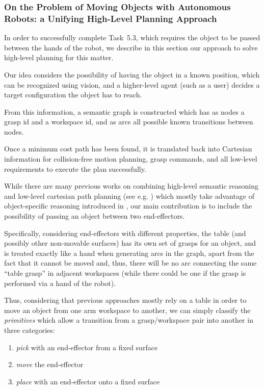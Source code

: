 
\subsubsection{On the Problem of Moving Objects with Autonomous Robots: a Unifying High-Level Planning Approach}
\label{sec:HighLevelPlanning}

In order to successfully complete Task~5.3, which requires the object to be passed between the hands of the robot, we describe in this section our approach to solve high-level planning for this matter.

Our idea considers the possibility of having the object in a known position, which can be recognized using vision, and a higher-level agent (such as a user) decides a target configuration the object has to reach.

From this information, a semantic graph is constructed which has as nodes a grasp id and a workspace id, and as arcs all possible known transitions between nodes.

Once a minimum cost path has been found, it is translated back into Cartesian information for collision-free motion planning, grasp commands, and all low-level requirements to execute the plan successfully.

While there are many previous works on combining high-level semantic reasoning and low-level cartesian path planning (see e.g. \cite{karlsson2012combining, leidner2012things, leidner2013hybrid}) which mostly take advantage of object-specific reasoning introduced in \cite{levison1996connecting}, our main contribution is to include the possibility of passing an object between two end-effectors.

Specifically, considering end-effectors with different properties, the table (and possibly other non-movable surfaces) has its own set of grasps for an object, and is treated exactly like a hand when generating arcs in the graph, apart from the fact that it cannot be moved and, thus, there will be no arc connecting the same ``table grasp'' in adjacent workspaces (while there could be one if the grasp is performed via a hand of the robot).

Thus, considering that previous approaches mostly rely on a table in order to move an object from one arm workspace to another, we can simply classify the \emph{primitives} which allow a transition from a grasp/workspace pair into another in three categories:
\begin{enumerate}
	\item \emph{pick} with an end-effector from a fixed surface
	\item \emph{move} the end-effector
	\item \emph{place} with an end-effector onto a fixed surface
\end{enumerate}

